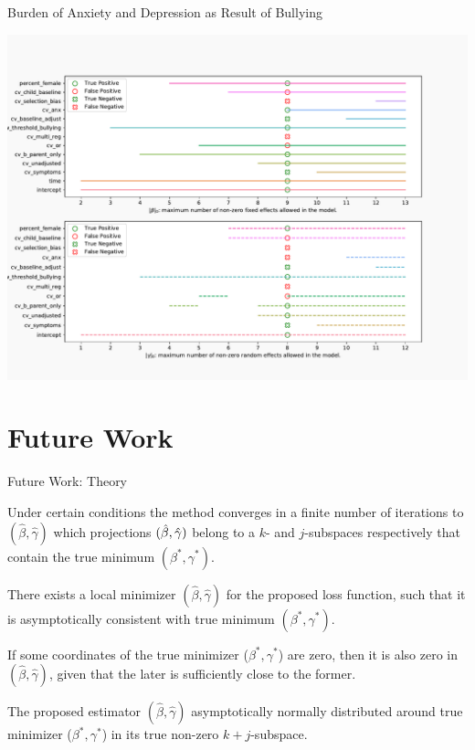\documentclass[8pt]{beamer}
\begin{document}
\begin{frame}{Burden of Anxiety and Depression as Result of Bullying}
	\begin{center}
		\includegraphics[width=\textwidth]{Figures/bullying_data.csv_inclusion}

	\end{center}
\end{frame}
\section{Future Work}
\begin{frame}{Future Work: Theory}
\begin{theorem}
	Under certain conditions the method converges in a finite number of iterations to $(\hat\beta, \hat\gamma)$ which projections $(\hat\beta, \hat\gamma)$ belong to a $k$- and $j$-subspaces respectively that contain the true minimum $(\beta^*,\gamma^*)$.
\end{theorem}
\begin{theorem}
	There exists a local minimizer $(\hat{\beta}, \hat{\gamma})$ for the proposed loss function, such that it is asymptotically consistent with true minimum $(\beta^*, \gamma^*)$. 
\end{theorem}
\begin{theorem}
	If some coordinates of the true minimizer ($\beta^*, \gamma^*$) are zero, then it is also zero in $(\hat{\beta}, \hat{\gamma})$, given that the later is sufficiently close to the former.
\end{theorem}
\begin{theorem}
	The proposed estimator $(\hat{\beta}, \hat{\gamma})$ asymptotically normally distributed around true minimizer ($\beta^*, \gamma^*$) in its true non-zero $k+j$-subspace.
\end{theorem}	
\end{frame}
\end{document}
